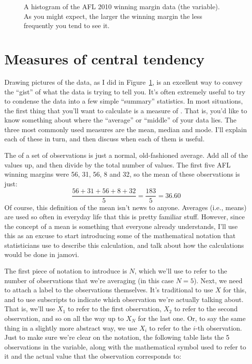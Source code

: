 \begin{figure}[ht]
\begin{center}
\caption{A histogram of the AFL 2010 winning margin data (the  variable). As you might expect, the larger the winning margin the less frequently you tend to see it.}
\label{fig:histogram1}
\HR
\end{center}
\end{figure}

\section{Measures of central tendency~\label{sec:centraltendency}}

Drawing pictures of the data, as I did in Figure~\ref{fig:histogram1}, is an excellent way to convey the ``gist'' of what the data is trying to tell you. It's often extremely useful to try to condense the data into a few simple ``summary'' statistics. In most situations, the first thing that you'll want to calculate is a measure of . That is, you'd like to know something about where the ``average'' or ``middle'' of your data lies. The three most commonly used measures are the mean, median and mode. I'll explain each of these in turn, and then discuss when each of them is useful.


The  of a set of observations is just a normal, old-fashioned average. Add all of the values up, and then divide by the total number of values. The first five AFL winning margins were 56, 31, 56, 8 and 32, so the mean of these observations is just:
$$
\frac{56 + 31 + 56 + 8 + 32}{5} = \frac{183}{5} = 36.60
$$
Of course, this definition of the mean isn't news to anyone. Averages (i.e., means) are used so often in everyday life that this is pretty familiar stuff. However, since the concept of a mean is something that everyone already understands, I'll use this as an excuse to start introducing some of the mathematical notation that statisticians use to describe this calculation, and talk about how the calculations would be done in jamovi. 

The first piece of notation to introduce is $N$, which we'll use to refer to the number of observations that we're averaging (in this case $N = 5$). Next, we need to attach a label to the observations themselves. It's traditional to use $X$ for this, and to use subscripts to indicate which observation we're actually talking about. That is, we'll use $X_1$ to refer to the first observation, $X_2$ to refer to the second observation, and so on all the way up to $X_N$ for the last one. Or, to say the same thing in a slightly more abstract way, we use $X_i$ to refer to the $i$-th observation. Just to make sure we're clear on the notation, the following table lists the 5 observations in the  variable, along with the mathematical symbol used to refer to it and the actual value that the observation corresponds to:

